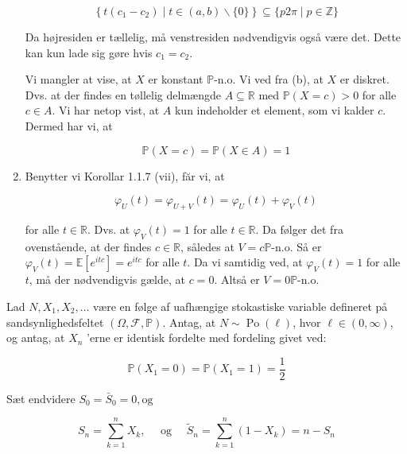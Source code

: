\documentclass{Class}
\newcommand{\1}{\mathbbm{1}}
\theoremstyle{boxed}
\begin{document}
\begin{enumerate}
  $$
  \left\{t\left(c_1-c_2\right) \mid t \in(a, b) \backslash\{0\}\right\} \subseteq\{p 2 \pi \mid p \in \mathbb{Z}\}
  $$
  
  
  Da højresiden er tællelig, må venstresiden nødvendigvis også være det. Dette kan kun lade sig gøre hvis $c_1=c_2$.
  
  Vi mangler at vise, at $X$ er konstant $\mathbb{P}$-n.o. Vi ved fra (b), at $X$ er diskret. Dvs. at der findes en tøllelig delmængde $A \subseteq \mathbb{R}$ med $\mathbb{P}(X=c)>0$ for alle $c \in A$. Vi har netop vist, at $A$ kun indeholder et element, som vi kalder $c$. Dermed har vi, at
  
  $$
  \mathbb{P}(X=c)=\mathbb{P}(X \in A)=1
  $$
\item Benytter vi Korollar 1.1.7 (vii), făr vi, at

$$
\varphi_U(t)=\varphi_{U+V}(t)=\varphi_U(t)+\varphi_V(t)
$$

for alle $t \in \mathbb{R}$. Dvs. at $\varphi_V(t)=1$ for alle $t \in \mathbb{R}$. Da følger det fra ovenstående, at der findes $c \in \mathbb{R}$, således at $V=c \mathbb{P}$-n.o. Så er $\varphi_V(t)=\mathbb{E}\left[e^{i t c}\right]=e^{i t c}$ for alle $t$. Da vi samtidig ved, at $\varphi_V(t)=1$ for alle $t$, må der nødvendigvis gælde, at $c=0$. Altså er $V=0 \mathbb{P}$-n.o.

\end{enumerate}
Lad $N, X_1, X_2, \ldots$ være en følge af uafhængige stokastiske variable defineret på sandsynlighedsfeltet $(\Omega, \mathcal{F}, \mathbb{P})$. Antag, at $N \sim \operatorname{Po}(\ell)$, hvor $\ell \in(0, \infty)$, og antag, at $X_n$ 'erne er identisk fordelte med fordeling givet ved:

$$
\mathbb{P}\left(X_1=0\right)=\mathbb{P}\left(X_1=1\right)=\frac{1}{2}
$$


Sæt endvidere $S_0=\bar{S}_0=0, \mathrm{og}$

$$
S_n=\sum_{k=1}^n X_k, \quad \text { og } \quad \tilde{S}_n=\sum_{k=1}^n\left(1-X_k\right)=n-S_n
$$
\end{document}
